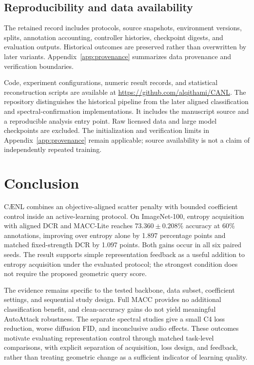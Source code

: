 \documentclass[a4paper,fleqn]{cas-dc}
\newcommand{\model}{C\AE{}NL}
\begin{document}
\subsection{Reproducibility and data availability}
\label{sec:reproducibility}

The retained record includes protocols, source snapshots,
environment versions, splits, annotation accounting,
controller histories, checkpoint digests, and evaluation
outputs. Historical outcomes are preserved rather than
overwritten by later variants.
Appendix~\ref{app:provenance} summarizes data provenance and
verification boundaries.

Code, experiment configurations, numeric result records, and statistical
reconstruction scripts are available at
\url{https://github.com/alqithami/CANL}.
The repository distinguishes the historical pipeline from the later aligned
classification and spectral-confirmation implementations. It includes the
manuscript source and a reproducible analysis entry point. Raw licensed
data and large model checkpoints are excluded. The initialization and
verification limits in Appendix~\ref{app:provenance} remain applicable;
source availability is not a claim of independently repeated training.

\section{Conclusion}\label{sec:conclusion}
\model{} combines an objective-aligned scatter penalty with bounded
coefficient control inside an active-learning protocol. On ImageNet-100,
entropy acquisition with aligned DCR and MACC-Lite reaches
$73.360\pm0.208\%$ accuracy at 60\% annotations, improving over entropy
alone by 1.897 percentage points and matched fixed-strength DCR by
1.097 points. Both gains occur in all six paired seeds. The result supports
simple representation feedback as a useful addition to entropy acquisition
under the evaluated protocol; the strongest condition does not require
the proposed geometric query score.

The evidence remains specific to the tested backbone, data subset,
coefficient settings, and sequential study design. Full MACC provides no
additional classification benefit, and clean-accuracy gains do not yield
meaningful AutoAttack robustness. The separate spectral studies give a
small C4 loss reduction, worse diffusion FID, and inconclusive audio
effects. These outcomes motivate evaluating representation control through
matched task-level comparisons, with explicit separation of acquisition,
loss design, and feedback, rather than treating geometric change as a
sufficient indicator of learning quality.
\end{document}
